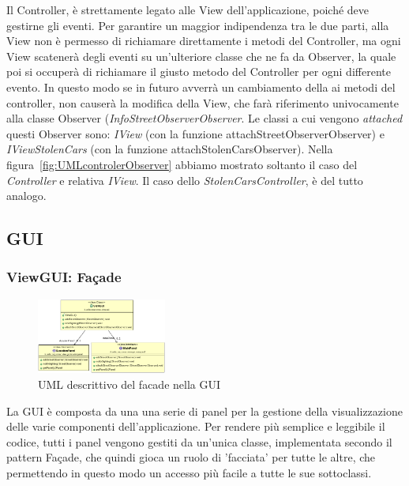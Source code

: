 \documentclass[a4paper,12pt]{report}
\begin{document}
      Il Controller, è strettamente legato alle View dell'applicazione, poiché 
deve gestirne gli eventi. Per garantire un maggior indipendenza tra le due 
parti, alla View non è permesso di richiamare direttamente i metodi del 
Controller, ma ogni View scatenerà degli eventi su un'ulteriore classe che ne 
fa da Observer, la quale poi si occuperà di richiamare il giusto metodo del 
Controller per ogni differente evento. In questo modo se in futuro avverrà un 
cambiamento della ai metodi del controller, non causerà la modifica della View, 
che farà riferimento univocamente alla classe Observer 
(\textit{InfoStreetObserverObserver}. 
Le classi a cui vengono \textit{attached} questi Observer sono: 
\textit{IView} (con la funzione attachStreetObserverObserver) e
\textit{IViewStolenCars} (con la funzione attachStolenCarsObserver). Nella 
figura~\ref{fig:UMLcontrolerObserver} abbiamo mostrato soltanto il caso del 
\textit{Controller} e relativa \textit{IView}. Il caso dello 
\textit{StolenCarsController}, è del tutto analogo.
\clearpage
  \subsection{GUI}
    \subsubsection {ViewGUI: Façade}
    \begin{figure}
      \vspace{-80pt}
      \begin{center}
	  \includegraphics[width=0.38\textwidth]{images/UMLviewFacade}
	\caption{UML descrittivo del facade nella GUI}
	\label{fig:UMLviewFacade}
      \end{center}
      \vspace{-10pt}
    \end{figure}

     La GUI è composta da una una serie di panel per la gestione della 
visualizzazione delle varie componenti dell'applicazione. Per rendere più 
semplice e leggibile il codice, tutti i panel vengono gestiti da un'unica 
classe, implementata secondo il pattern Façade, che quindi gioca un ruolo di 
'facciata' per tutte le altre, che permettendo in questo modo un accesso più 
facile a tutte le sue sottoclassi.
\end{document}
